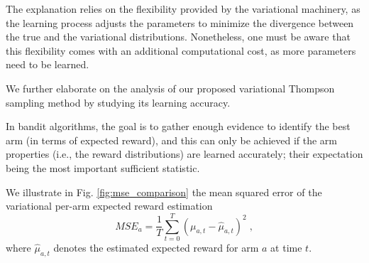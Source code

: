 \documentclass{article}
\newcommand{\ie}{i.e., }
\begin{document}
The explanation relies on the flexibility provided by the variational machinery, as the learning process adjusts the parameters to minimize the divergence between the true and the variational distributions. Nonetheless, one must be aware that this flexibility comes with an additional computational cost, as more parameters need to be learned.

We further elaborate on the analysis of our proposed variational Thompson sampling method by studying its learning accuracy.

In bandit algorithms, the goal is to gather enough evidence to identify the best arm (in terms of expected reward), and this can only be achieved if the arm properties (\ie the reward distributions) are learned accurately; their expectation being the most important sufficient statistic.

We illustrate in Fig. \ref{fig:mse_comparison} the mean squared error of the variational per-arm expected reward estimation
\begin{equation}
MSE_a=\frac{1}{T}\sum_{t=0}^T \left(\mu_{a,t}-\hat{\mu}_{a,t} \right)^2 \; ,
\end{equation}
where $\hat{\mu}_{a,t}$ denotes the estimated expected reward for arm $a$ at time $t$.
\end{document}
